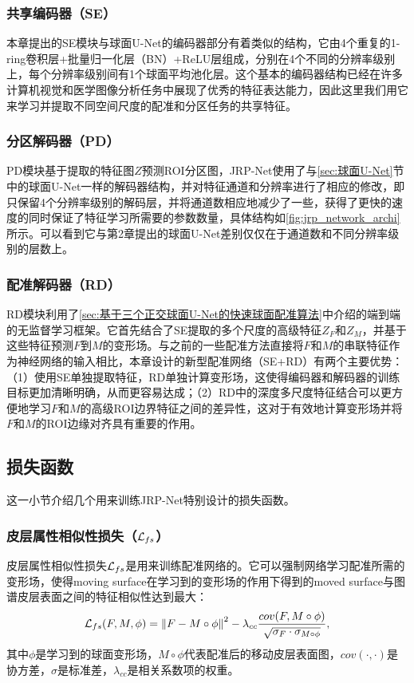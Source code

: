 \subsubsection{共享编码器（SE）}
本章提出的SE模块与球面U-Net的编码器部分有着类似的结构，它由4个重复的1-ring卷积层+批量归一化层（BN）+ReLU层组成，分别在4个不同的分辨率级别上，每个分辨率级别间有1个球面平均池化层。这个基本的编码器结构已经在许多计算机视觉和医学图像分析任务中展现了优秀的特征表达能力\cite{ronneberger2015u}，因此这里我们用它来学习并提取不同空间尺度的配准和分区任务的共享特征。

\subsubsection{分区解码器（PD）}
PD模块基于提取的特征图$Z$预测ROI分区图，JRP-Net使用了与\ref{sec:球面U-Net}节中的球面U-Net一样的解码器结构，并对特征通道和分辨率进行了相应的修改，即只保留4个分辨率级别的解码层，并将通道数相应地减少了一些，获得了更快的速度的同时保证了特征学习所需要的参数数量，具体结构如\ref{fig:jrp_network_archi}所示。可以看到它与第2章提出的球面U-Net差别仅仅在于通道数和不同分辨率级别的层数上。

\subsubsection{配准解码器（RD）}
RD模块利用了\ref{sec:基于三个正交球面U-Net的快速球面配准算法}中介绍的端到端的无监督学习框架。它首先结合了SE提取的多个尺度的高级特征$Z_F$和$Z_M$，并基于这些特征预测$F$到$M$的变形场。与之前的一些配准方法\cite{cheng2020cortical}直接将$F$和$M$的串联特征作为神经网络的输入相比，本章设计的新型配准网络（SE+RD）有两个主要优势：（1）使用SE单独提取特征，RD单独计算变形场，这使得编码器和解码器的训练目标更加清晰明确，从而更容易达成；（2）RD中的深度多尺度特征结合可以更方便地学习$F$和$M$的高级ROI边界特征之间的差异性，这对于有效地计算变形场并将$F$和$M$的ROI边缘对齐具有重要的作用\cite{liu2019probabilistic}。


\subsection{损失函数}\label{sec:同时分区与配准的损失函数}
这一小节介绍几个用来训练JRP-Net特别设计的损失函数。
\subsubsection{皮层属性相似性损失（${\cal L}_{fs}$）}
皮层属性相似性损失${\cal L}_{fs}$是用来训练配准网络的。它可以强制网络学习配准所需的变形场，使得moving surface在学习到的变形场的作用下得到的moved surface与图谱皮层表面之间的特征相似性达到最大：
\begin{equation}\label{eq:4.1}
{\cal L}_{fs}(F,M,\phi)={\| F-M\circ \phi \|}^2 -\lambda_{cc}\frac{cov(F,M\circ \phi)}{\sqrt{\sigma_F \cdot \sigma_{M\circ \phi}}},
\end{equation}
其中$\phi$是学习到的球面变形场，$M\circ \phi$代表配准后的移动皮层表面图，$cov(\cdot,\cdot)$是协方差，$\sigma$是标准差，$\lambda_{cc}$是相关系数项的权重。

